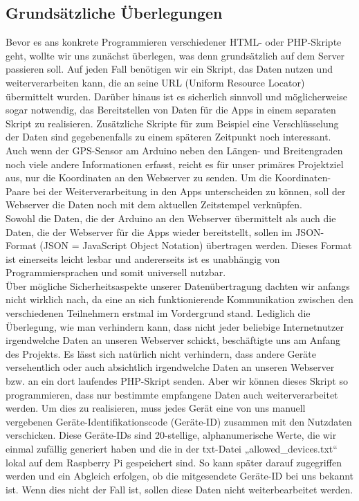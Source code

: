 \subsection{Grundsätzliche Überlegungen}
Bevor es ans konkrete Programmieren verschiedener HTML- oder PHP-Skripte geht, wollte wir uns zunächst überlegen, was denn grundsätzlich auf dem Server passieren soll. Auf jeden Fall benötigen wir ein Skript, das Daten nutzen und weiterverarbeiten kann, die an seine URL (Uniform Resource Locator) übermittelt wurden. Darüber hinaus ist es sicherlich sinnvoll und möglicherweise sogar notwendig, das Bereitstellen von Daten für die Apps in einem separaten Skript zu realisieren. Zusätzliche Skripte für zum Beispiel eine Verschlüsselung der Daten sind gegebenenfalls zu einem späteren Zeitpunkt noch interessant.
Auch wenn der GPS-Sensor am Arduino neben den Längen- und Breitengraden noch viele andere Informationen erfasst, reicht es für unser primäres Projektziel aus, nur die Koordinaten an den Webserver zu senden. Um die Koordinaten-Paare bei der Weiterverarbeitung in den Apps unterscheiden zu können, soll der Webserver die Daten noch mit dem aktuellen Zeitstempel verknüpfen.
\\
Sowohl die Daten, die der Arduino an den Webserver übermittelt als auch die Daten, die der Webserver für die Apps wieder bereitstellt, sollen im JSON-Format (JSON = JavaScript Object Notation) übertragen werden. Dieses Format ist einerseits leicht lesbar und andererseits ist es unabhängig von Programmiersprachen und somit universell nutzbar.
\\
Über mögliche Sicherheitsaspekte unserer Datenübertragung dachten wir anfangs nicht wirklich nach, da eine an sich funktionierende Kommunikation zwischen den verschiedenen Teilnehmern erstmal im Vordergrund stand. Lediglich die Überlegung, wie man verhindern kann, dass nicht jeder beliebige Internetnutzer irgendwelche Daten an unseren Webserver schickt, beschäftigte uns am Anfang des Projekts. Es lässt sich natürlich nicht verhindern, dass andere Geräte versehentlich oder auch absichtlich irgendwelche Daten an unseren Webserver bzw. an ein dort laufendes PHP-Skript senden. Aber wir können dieses Skript so programmieren, dass nur bestimmte empfangene Daten auch weiterverarbeitet werden. Um dies zu realisieren, muss jedes Gerät eine von uns manuell vergebenen Geräte-Identifikationscode (Geräte-ID) zusammen mit den Nutzdaten verschicken. Diese Geräte-IDs sind 20-stellige, alphanumerische Werte, die wir einmal zufällig generiert haben und die in der txt-Datei „allowed\_devices.txt“ lokal auf dem Raspberry Pi gespeichert sind. So kann später darauf zugegriffen werden und ein Abgleich erfolgen, ob die mitgesendete Geräte-ID bei uns bekannt ist. Wenn dies nicht der Fall ist, sollen diese Daten nicht weiterbearbeitet werden.
